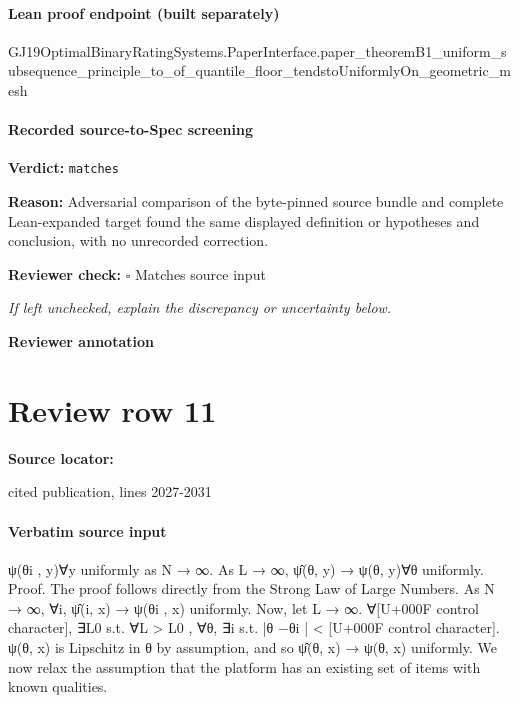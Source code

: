 \documentclass[10pt]{article}
\newcommand{\reviewerbox}{%
  \par\noindent\fbox{\parbox{0.96\linewidth}{\rule{0pt}{0.38in}}}\par
}
\newcommand{\reviewmatch}[1]{%
  \par\noindent\textbf{Reviewer check:} $\square$\; #1\par
  \noindent\emph{If left unchecked, explain the discrepancy or uncertainty below.}\par
}
\begin{document}
\paragraph{Lean proof endpoint (built separately)}\begin{ReviewVerbatim}
GJ19OptimalBinaryRatingSystems.PaperInterface.paper_theoremB1_uniform_subsequence_principle_to_of_quantile_floor_tendstoUniformlyOn_geometric_mesh
\end{ReviewVerbatim}

\paragraph{Recorded source-to-Spec screening}
\textbf{Verdict:} \texttt{matches}
\\
{\raggedright
\textbf{Reason:} Adversarial comparison of the byte-\allowbreak{}pinned source bundle and complete Lean-\allowbreak{}expanded target found the same displayed definition or hypotheses and conclusion, with no unrecorded correction.\allowbreak{}
\par}
\reviewmatch{Matches source input}
\noindent\textbf{Reviewer annotation}\par
\reviewerbox
\clearpage
\hypertarget{source-claim-276fd5feab006dec}{}
\section*{Review row 11}
\textbf{Source locator:} {\footnotesize\raggedright cited publication, lines 2027-\allowbreak{}2031\par}
\paragraph{Verbatim source input}
\begin{ReviewVerbatim}
ψ(θi , y)∀y uniformly as N → ∞. As L → ∞, ψ̂(θ, y) → ψ(θ, y)∀θ uniformly.
Proof. The proof follows directly from the Strong Law of Large Numbers. As N → ∞, ∀i, ψ̂(i, x) →
ψ(θi , x) uniformly. Now, let L → ∞. ∀[U+000F control character], ∃L0 s.t. ∀L > L0 , ∀θ, ∃i s.t. |θ −θi | < [U+000F control character]. ψ(θ, x) is Lipschitz
in θ by assumption, and so ψ̂(θ, x) → ψ(θ, x) uniformly.
We now relax the assumption that the platform has an existing set of items with known qualities.
\end{ReviewVerbatim}
\end{document}
